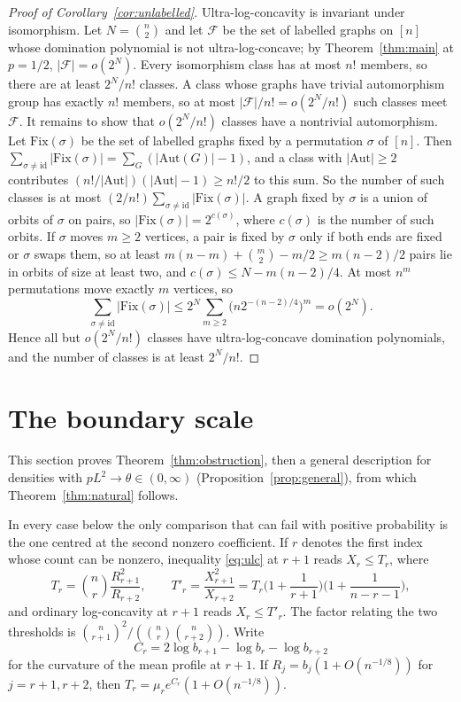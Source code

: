 \documentclass[11pt]{article}
\theoremstyle{remark}
\begin{document}
\begin{proof}[Proof of Corollary~\ref{cor:unlabelled}]
Ultra-log-concavity is invariant under isomorphism. Let $N=\binom n2$ and let $\mathcal F$ be the set of labelled graphs on $[n]$ whose domination polynomial is not ultra-log-concave; by Theorem~\ref{thm:main} at $p=1/2$, $|\mathcal F|=o(2^N)$. Every isomorphism class has at most $n!$ members, so there are at least $2^N/n!$ classes. A class whose graphs have trivial automorphism group has exactly $n!$ members, so at most $|\mathcal F|/n!=o(2^N/n!)$ such classes meet $\mathcal F$. It remains to show that $o(2^N/n!)$ classes have a nontrivial automorphism. Let $\mathrm{Fix}(\sigma)$ be the set of labelled graphs fixed by a permutation $\sigma$ of $[n]$. Then $\sum_{\sigma\ne\mathrm{id}}|\mathrm{Fix}(\sigma)|=\sum_G(|\mathrm{Aut}(G)|-1)$, and a class with $|\mathrm{Aut}|\ge2$ contributes $(n!/|\mathrm{Aut}|)(|\mathrm{Aut}|-1)\ge n!/2$ to this sum. So the number of such classes is at most $(2/n!)\sum_{\sigma\ne\mathrm{id}}|\mathrm{Fix}(\sigma)|$. A graph fixed by $\sigma$ is a union of orbits of $\sigma$ on pairs, so $|\mathrm{Fix}(\sigma)|=2^{c(\sigma)}$, where $c(\sigma)$ is the number of such orbits. If $\sigma$ moves $m\ge2$ vertices, a pair is fixed by $\sigma$ only if both ends are fixed or $\sigma$ swaps them, so at least $m(n-m)+\binom m2-m/2\ge m(n-2)/2$ pairs lie in orbits of size at least two, and $c(\sigma)\le N-m(n-2)/4$. At most $n^m$ permutations move exactly $m$ vertices, so
\[
 \sum_{\sigma\ne\mathrm{id}}|\mathrm{Fix}(\sigma)|\le2^N\sum_{m\ge2}\big(n2^{-(n-2)/4}\big)^m=o(2^N).
\]
Hence all but $o(2^N/n!)$ classes have ultra-log-concave domination polynomials, and the number of classes is at least $2^N/n!$.
\end{proof}

\section{The boundary scale}\label{sec:boundary}
This section proves Theorem~\ref{thm:obstruction}, then a general description for densities with $pL^2\to\theta\in(0,\infty)$ (Proposition~\ref{prop:general}), from which Theorem~\ref{thm:natural} follows.

In every case below the only comparison that can fail with positive probability is the one centred at the second nonzero coefficient. If $r$ denotes the first index whose count can be nonzero, inequality \eqref{eq:ulc} at $r+1$ reads $X_r\le T_r$, where
\begin{equation}
 T_r=\binom nr\frac{R_{r+1}^2}{R_{r+2}},\qquad
 T'_r=\frac{X_{r+1}^2}{X_{r+2}}=T_r\Big(1+\frac1{r+1}\Big)\Big(1+\frac1{n-r-1}\Big),
 \label{eq:test}
\end{equation}
and ordinary log-concavity at $r+1$ reads $X_r\le T'_r$. The factor relating the two thresholds is $\binom n{r+1}^2/(\binom nr\binom n{r+2})$. Write
\[
 C_r=2\log b_{r+1}-\log b_r-\log b_{r+2}
\]
for the curvature of the mean profile at $r+1$. If $R_j=b_j(1+O(n^{-1/8}))$ for $j=r+1,r+2$, then $T_r=\mu_re^{C_r}(1+O(n^{-1/8}))$.
\end{document}
